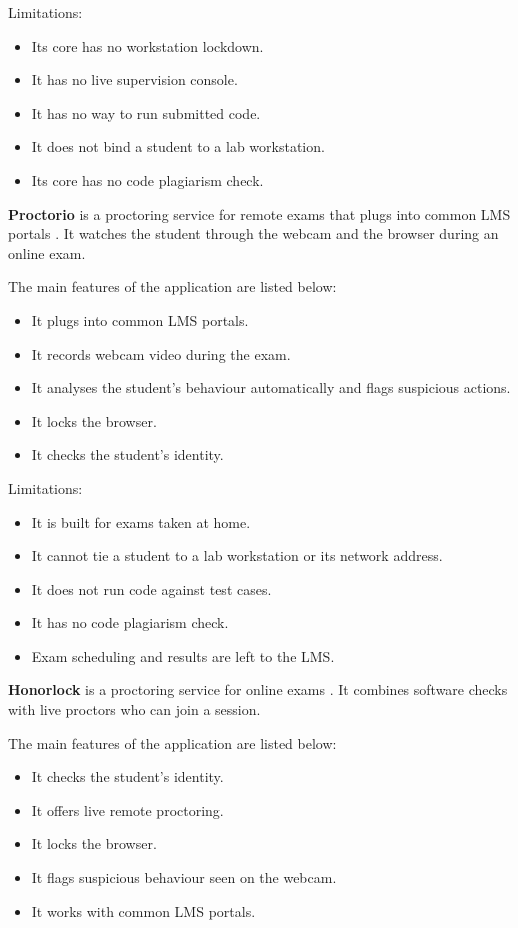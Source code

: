 \noindent Limitations:
\begin{itemize}[noitemsep]
\item Its core has no workstation lockdown.
\item It has no live supervision console.
\item It has no way to run submitted code.
\item It does not bind a student to a lab workstation.
\item Its core has no code plagiarism check.
\end{itemize}

\noindent\textbf{Proctorio} is a proctoring service for remote exams that plugs into common LMS portals \cite{proctorio1}. It watches the student through the webcam and the browser during an online exam.

\noindent The main features of the application are listed below:
\begin{itemize}[noitemsep]
\item It plugs into common LMS portals.
\item It records webcam video during the exam.
\item It analyses the student's behaviour automatically and flags suspicious actions.
\item It locks the browser.
\item It checks the student's identity.
\end{itemize}

\noindent Limitations:
\begin{itemize}[noitemsep]
\item It is built for exams taken at home.
\item It cannot tie a student to a lab workstation or its network address.
\item It does not run code against test cases.
\item It has no code plagiarism check.
\item Exam scheduling and results are left to the LMS.
\end{itemize}

\noindent\textbf{Honorlock} is a proctoring service for online exams \cite{honorlock1}. It combines software checks with live proctors who can join a session.

\noindent The main features of the application are listed below:
\begin{itemize}[noitemsep]
\item It checks the student's identity.
\item It offers live remote proctoring.
\item It locks the browser.
\item It flags suspicious behaviour seen on the webcam.
\item It works with common LMS portals.
\end{itemize}

